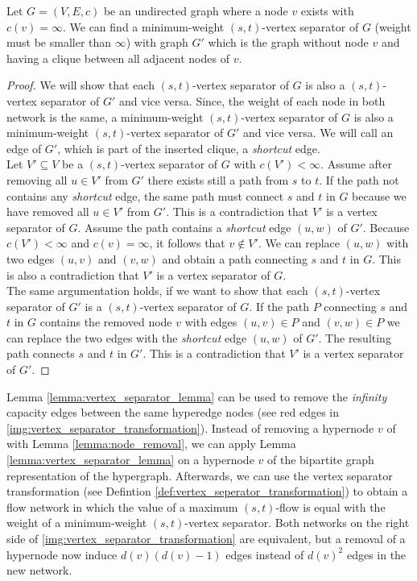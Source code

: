 \begin{lemma}
\label{lemma:vertex_separator_lemma}
Let $G = (V,E,c)$ be an undirected graph where a node $v$ exists with $c(v) = \infty$.
We can find a minimum-weight $(s,t)$-vertex separator of $G$ (weight must be smaller than 
$\infty$) with graph $G'$ which is the graph without node $v$ and having a clique 
between all adjacent nodes of $v$.
\end{lemma}

\begin{proof}
We will show that each $(s,t)$-vertex separator of $G$ is also a $(s,t)$-vertex separator
of $G'$ and vice versa. Since, the weight of each node in both network is the same, a minimum-weight
$(s,t)$-vertex separator of $G$ is also a minimum-weight $(s,t)$-vertex separator of $G'$ and vice versa.
We will call an edge of $G'$, which is part of the inserted clique, a \emph{shortcut} edge.\\
Let $V' \subseteq V$ be a $(s,t)$-vertex separator of $G$ with $c(V') < \infty$. Assume after removing
all $u \in V'$ from $G'$ there exists still a path from $s$ to $t$. If the path not contains any
\emph{shortcut} edge, the same path must connect $s$ and $t$ in $G$ because we have removed all $u \in V'$
from $G'$. This is a contradiction that $V'$ is a vertex separator of $G$. Assume the path contains
a \emph{shortcut} edge $(u,w)$ of $G'$.  Because $c(V') < \infty$ and $c(v) = \infty$,
it follows that $v \notin V'$. We can replace $(u,w)$ with two edges $(u,v)$ and $(v,w)$
and obtain a path connecting $s$ and $t$ in $G$. This is also a contradiction that $V'$ is a vertex
separator of $G$.\\
The same argumentation holds, if we want to show that each $(s,t)$-vertex separator of $G'$
is a $(s,t)$-vertex separator of $G$. If the path $P$ connecting $s$ and $t$ in $G$ contains
the removed node $v$ with edges $(u,v) \in P$ and $(v,w) \in P$ we can replace the two edges
with the \emph{shortcut} edge $(u,w)$ of $G'$. The resulting path connects $s$ and $t$ in $G'$.
This is a contradiction that $V'$ is a vertex separator of $G'$.
\end{proof}

Lemma \ref{lemma:vertex_separator_lemma} can be used to remove the \emph{infinity} capacity
edges between the same hyperedge nodes (see red edges in \autoref{img:vertex_separator_transformation}).
Instead of removing a hypernode $v$ of  with Lemma \ref{lemma:node_removal}, we can apply
Lemma \ref{lemma:vertex_separator_lemma} on a hypernode $v$ of the bipartite graph representation
of the hypergraph. Afterwards, we can use the vertex separator transformation (see Defintion \ref{def:vertex_seperator_transformation})
to obtain a flow network in which the value of a maximum $(s,t)$-flow is equal with the
weight of a minimum-weight $(s,t)$-vertex separator. Both networks on the right side of 
\autoref{img:vertex_separator_transformation} are equivalent, but a removal of a hypernode
now induce $d(v)(d(v) - 1)$ edges instead of $d(v)^2$ edges in the new network.

